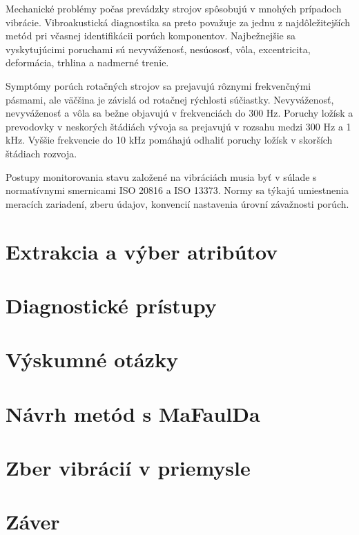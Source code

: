 Mechanické problémy počas prevádzky strojov spôsobujú v mnohých prípadoch vibrácie. Vibroakustická diagnostika sa preto považuje za jednu z najdôležitejších metód pri včasnej identifikácii porúch komponentov. Najbežnejšie sa vyskytujúcimi poruchami sú nevyváženosť, nesúososť, vôla, excentricita, deformácia, trhlina a nadmerné trenie. 

Symptómy porúch rotačných strojov sa prejavujú rôznymi frekvenčnými pásmami, ale väčšina je závislá od rotačnej rýchlosti súčiastky. Nevyváženosť, nevyváženosť a vôla sa bežne objavujú v frekvenciách do 300 Hz. Poruchy ložísk a prevodovky v neskorých štádiách vývoja sa prejavujú v rozsahu medzi 300 Hz a 1 kHz. Vyššie frekvencie do 10 kHz pomáhajú odhaliť poruchy ložísk v skorších štádiach rozvoja.

Postupy monitorovania stavu založené na vibráciách musia byť v súlade s normatívnymi smernicami ISO 20816 a ISO 13373. Normy sa týkajú umiestnenia meracích zariadení, zberu údajov, konvencií nastavenia úrovní závažnosti porúch. 


\section{Extrakcia a výber atribútov}

\section{Diagnostické prístupy}


\section{Výskumné otázky}


\section{Návrh metód s MaFaulDa}


\section{Zber vibrácií v priemysle}


\section{Záver}


\clearpage
